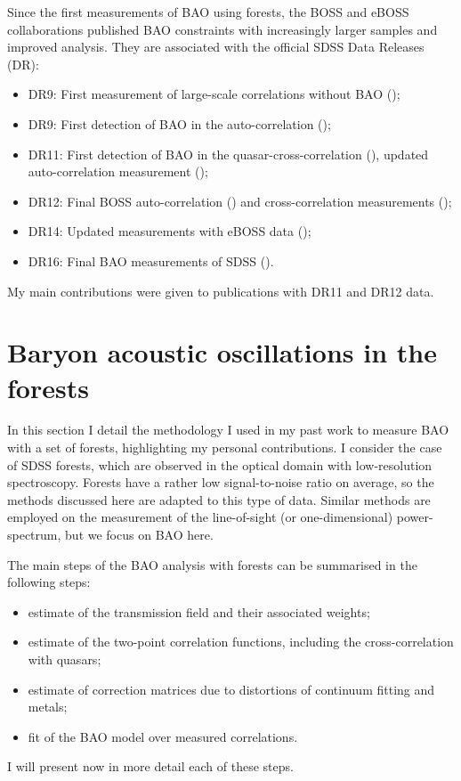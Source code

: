 Since the first measurements of BAO using forests, the BOSS and eBOSS collaborations 
published BAO constraints with increasingly larger samples and improved analysis.
They are associated with the official SDSS Data Releases (DR):
\begin{itemize}
 \item DR9: First measurement of large-scale \lya correlations without BAO (\cite{slosarLymanAlphaForest2011}); 
 \item DR9: First detection of BAO in the \lya auto-correlation 
            (\cite{buscaBaryonAcousticOscillations2013, slosarMeasurementBaryonAcoustic2013, kirkbyFittingMethodsBaryon2013});
 \item DR11: First detection of BAO in the quasar-\lya cross-correlation (\cite{font-riberaQuasarLymanAlphaForest2014}), 
             updated auto-correlation measurement (\cite{delubacBaryonAcousticOscillations2015});
 \item DR12: Final BOSS auto-correlation (\cite{bautistaMeasurementBaryonAcoustic2017}) 
             and cross-correlation measurements (\cite{dumasdesbourbouxBaryonAcousticOscillations2017});
 \item DR14: Updated measurements with eBOSS data (\cite{desainteagatheBaryonAcousticOscillations2019, blomqvistBaryonAcousticOscillations2019});
 \item DR16: Final \lya BAO measurements of SDSS (\cite{dumasdesbourbouxhelionCompletedSDSSIVExtended2020}).
\end{itemize}

My main contributions were given to publications with DR11 and DR12 data. 

\section{Baryon acoustic oscillations in the forests}
\label{forests:bao}

In this section I detail the methodology I used in my past work 
to measure BAO with a set of \lya forests, highlighting my 
personal contributions. I consider the case of SDSS forests, 
which are observed in the optical domain with low-resolution spectroscopy.
Forests have a rather low signal-to-noise ratio on average, 
so the methods discussed here are adapted to this type of data. 
Similar methods are employed on the measurement of the line-of-sight
(or one-dimensional) power-spectrum, but we focus on BAO here. 

The main steps of the BAO analysis with \lya forests can be summarised in the following steps:
\begin{itemize}
    \item estimate of the transmission field and their associated weights;
    \item estimate of the two-point correlation functions, including the cross-correlation with quasars;
    \item estimate of correction matrices due to distortions of continuum fitting and metals; 
    \item fit of the BAO model over measured correlations.
\end{itemize}
I will present now in more detail each of these steps. 

